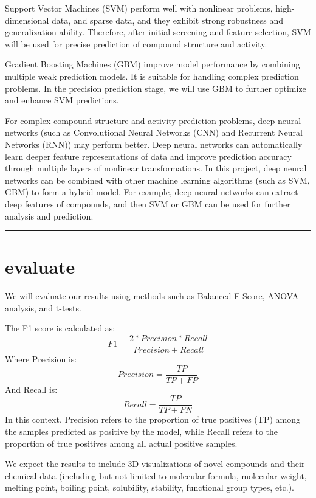\documentclass{ctexart}
\begin{document}
Support Vector Machines (SVM) perform well with nonlinear problems, high-dimensional data, and sparse data, and they exhibit strong robustness and generalization ability. Therefore, after initial screening and feature selection, SVM will be used for precise prediction of compound structure and activity.

Gradient Boosting Machines (GBM) improve model performance by combining multiple weak prediction models. It is suitable for handling complex prediction problems. In the precision prediction stage, we will use GBM to further optimize and enhance SVM predictions.

For complex compound structure and activity prediction problems, deep neural networks (such as Convolutional Neural Networks (CNN) and Recurrent Neural Networks (RNN)) may perform better. Deep neural networks can automatically learn deeper feature representations of data and improve prediction accuracy through multiple layers of nonlinear transformations. In this project, deep neural networks can be combined with other machine learning algorithms (such as SVM, GBM) to form a hybrid model. For example, deep neural networks can extract deep features of compounds, and then SVM or GBM can be used for further analysis and prediction.
\vspace{1em}
\hrule
\section{evaluate}

We will evaluate our results using methods such as Balanced F-Score, ANOVA analysis, and t-tests.

The F1 score is calculated as:
\begin{equation}
F1= \frac{2 * Precision * Recall}{Precision + Recall}
\end{equation}
Where Precision is:
\begin{equation}
Precision=\frac{TP}{TP+FP}
\end{equation}
And Recall is:
\begin{equation}
Recall = \frac{TP}{TP + FN}
\end{equation}
In this context, Precision refers to the proportion of true positives (TP) among the samples predicted as positive by the model, while Recall refers to the proportion of true positives among all actual positive samples.

We expect the results to include 3D visualizations of novel compounds and their chemical data (including but not limited to molecular formula, molecular weight, melting point, boiling point, solubility, stability, functional group types, etc.).
\end{document}
